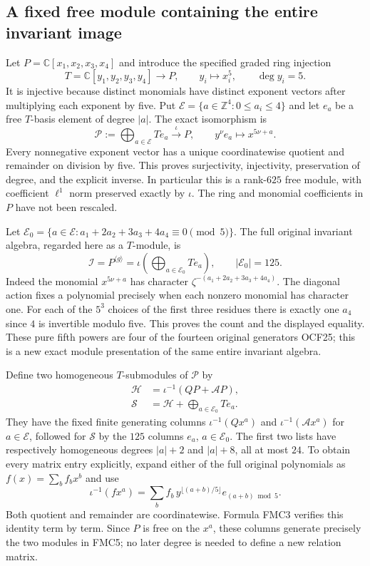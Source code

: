 \documentclass[11pt,a4paper]{article}
\begin{document}
\subsection{A fixed free module containing the entire invariant image}

Let $P=\mathbb C[x_1,x_2,x_3,x_4]$ and introduce the specified
graded ring injection
\[
 T=\mathbb C[y_1,y_2,y_3,y_4]\longrightarrow P,
 \qquad y_i\longmapsto x_i^5,\qquad \deg y_i=5.
 \tag{FMC2}
\]
It is injective because distinct monomials have distinct exponent
vectors after multiplying each exponent by five. Put
$\mathcal E=\{a\in\mathbb Z^4:0\le a_i\le4\}$ and let $e_a$
be a free $T$-basis element of degree $|a|$. The exact isomorphism is
\[
 \mathscr P:=\bigoplus_{a\in\mathcal E}T e_a
       \xrightarrow{\ \iota\ }P,
 \qquad y^\nu e_a\longmapsto x^{5\nu+a}.
 \tag{FMC3}
\]
Every nonnegative exponent vector has a unique coordinatewise quotient
and remainder on division by five. This proves surjectivity, injectivity,
preservation of degree, and the explicit inverse. In particular this
is a rank-$625$ free module, with coefficient $\ell^1$ norm preserved
exactly by $\iota$. The ring and monomial coefficients in $P$ have
not been rescaled.

Let $\mathcal E_0=\{a\in\mathcal E:
a_1+2a_2+3a_3+4a_4\equiv0\pmod5\}$. The full original invariant
algebra, regarded here as a $T$-module, is
\[
 \mathscr I=P^{\langle g\rangle}
       =\iota\left(\bigoplus_{a\in\mathcal E_0}T e_a\right),
 \qquad |\mathcal E_0|=125.
 \tag{FMC4}
\]
Indeed the monomial $x^{5\nu+a}$ has character
$\zeta^{-(a_1+2a_2+3a_3+4a_4)}$. The diagonal action fixes a
polynomial precisely when each nonzero monomial has character one.
For each of the $5^3$ choices of the first three residues there is
exactly one $a_4$ since $4$ is invertible modulo five. This proves
the count and the displayed equality. These pure fifth powers are
four of the fourteen original generators OCF25; this is a new exact
module presentation of the same entire invariant algebra.

Define two homogeneous $T$-submodules of $\mathscr P$ by
\[
 \begin{split}
 \mathscr H&=\iota^{-1}(QP+\mathcal A P),\\
 \mathscr S&=\mathscr H+
                       \bigoplus_{a\in\mathcal E_0}T e_a.
 \end{split}\tag{FMC5}
\]
They have the fixed finite generating columns
$\iota^{-1}(Qx^a)$ and $\iota^{-1}(\mathcal A x^a)$ for
$a\in\mathcal E$, followed for $\mathscr S$ by the $125$ columns
$e_a$, $a\in\mathcal E_0$. The first two lists have respectively
homogeneous degrees $|a|+2$ and $|a|+8$, all at most $24$.
To obtain every matrix entry explicitly, expand either of the full
original polynomials as $f(x)=\sum_b f_bx^b$ and use
\[
 \iota^{-1}(f x^a)=
       \sum_b f_b\,y^{\lfloor(a+b)/5\rfloor}
                         e_{(a+b)\bmod5}.
 \tag{FMC6}
\]
Both quotient and remainder are coordinatewise. Formula FMC3 verifies
this identity term by term. Since $P$ is free on the $x^a$, these
columns generate precisely the two modules in FMC5; no later degree
is needed to define a new relation matrix.
\end{document}
